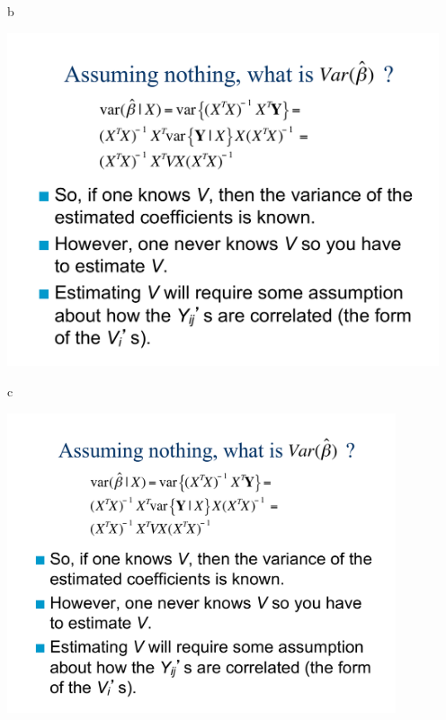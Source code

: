 \documentclass[ignorenonframetext,]{beamer}
\begin{document}
\begin{frame}{b}

\includegraphics[page=3,width=5in]{Chapter5AddSlides1.pdf}

\end{frame}

\begin{frame}{c}

\includegraphics[page=4,width=4.5in]{Chapter5AddSlides1.pdf}

\end{frame}
\end{document}
